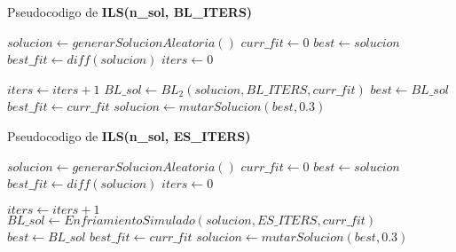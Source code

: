      Pseudocodigo de \textbf{ILS(n\_sol, BL\_ITERS)}
     \begin{algorithm}[H]
       \begin{algorithmic}[1]
          \State $solucion \gets generarSolucionAleatoria()$
          \State $curr\_fit \gets 0$
          \State $best \gets solucion$
          \State $best\_fit \gets diff(solucion)$
          \State $iters \gets 0$

            \State $ iters \gets iters + 1$
            \State $BL\_sol \gets BL_2(solucion,BL\_ITERS,curr\_fit)$ 
              \State $best \gets BL\_sol$
              \State $best\_fit \gets curr\_fit$
            \EndIf
            \State $solucion \gets mutarSolucion(best,0.3)$
            \EndWhile
          \State {}
         \EndFunction
       \end{algorithmic}
     \end{algorithm}

     Pseudocodigo de \textbf{ILS(n\_sol, ES\_ITERS)}
     \begin{algorithm}[H]
       \begin{algorithmic}[1]
          \State $solucion \gets generarSolucionAleatoria()$
          \State $curr\_fit \gets 0$
          \State $best \gets solucion$
          \State $best\_fit \gets diff(solucion)$
          \State $iters \gets 0$

            \State $ iters \gets iters + 1$
            \State $BL\_sol \gets EnfriamientoSimulado(solucion,ES\_ITERS,curr\_fit)$ 
              \State $best \gets BL\_sol$
              \State $best\_fit \gets curr\_fit$
            \EndIf
            \State $solucion \gets mutarSolucion(best,0.3)$
            \EndWhile
          \State {}
         \EndFunction
       \end{algorithmic}
     \end{algorithm}


